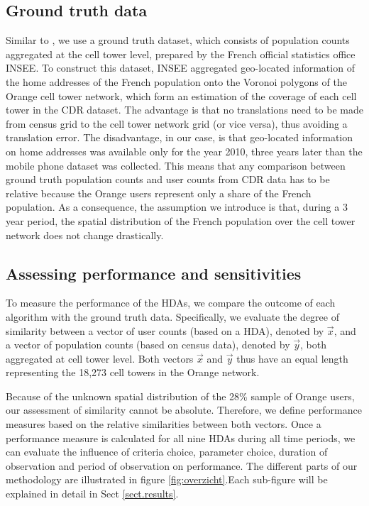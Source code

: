 \documentclass[a4paper]{article}
\begin{document}
\subsection{Ground truth data}

Similar to \cite{Vanhoof_JOS}, we use a ground truth dataset, which consists of population counts aggregated at the cell tower level, prepared by the French official statistics office INSEE. To construct this dataset, INSEE aggregated geo-located information of the home addresses of the French population onto the Voronoi polygons of the Orange cell tower network, which form an estimation of the coverage of each cell tower in the CDR dataset. The advantage is that no translations need to be made from census grid to the cell tower network grid (or vice versa), thus avoiding a translation error. The disadvantage, in our case, is that geo-located information on home addresses was available only for the year 2010, three years later than the mobile phone dataset was collected. This means that any comparison between ground truth population counts and user counts from CDR data has to be relative because the Orange users represent only a share of the French population. As a consequence, the assumption we introduce is that, during a 3 year period, the spatial distribution of the French population over the cell tower network does not change drastically.

\subsection{Assessing performance and sensitivities}
To measure the performance of the HDAs, we compare the outcome of each algorithm with the ground truth data. Specifically, we evaluate the degree of similarity between a vector of user counts (based on a HDA), denoted by $\vec{x}$, and a vector of population counts (based on census data), denoted by $\vec{y}$, both aggregated at cell tower level. Both vectors $\vec{x}$ and $\vec{y}$ thus have an equal length representing the 18,273 cell towers in the Orange network.

Because of the unknown spatial distribution of the 28\% sample of Orange users, our assessment of similarity cannot be absolute. Therefore, we define performance measures based on the relative similarities between both vectors. Once a performance measure is calculated for all nine HDAs during all time periods, we can evaluate the influence of criteria choice, parameter choice, duration of observation and period of observation on performance. The different parts of our methodology are illustrated in figure \ref{fig:overzicht}.Each sub-figure will be explained in detail in Sect \ref{sect.results}.
\end{document}
